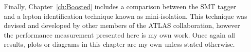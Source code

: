 
Finally, Chapter~\ref{ch:Boosted} includes a comparison between the SMT tagger and a lepton identification technique known as mini-isolation. This technique was devised and developed by other members of the ATLAS collaboration, however the performance measurement presented here is my own work. Once again all results, plots or diagrams in this chapter are my own unless stated otherwise.
